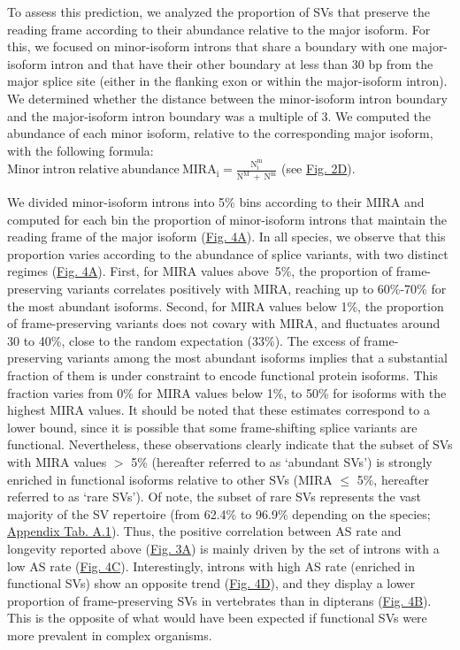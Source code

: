 To assess this prediction, we analyzed the proportion of \acrshort{SV}s that preserve the reading frame according to their abundance relative to the major isoform. For this, we focused on minor-isoform introns that share a boundary with one major-isoform intron and that have their other boundary at less than 30 bp from the major splice site (either in the flanking exon or within the major-isoform intron). We determined whether the distance between the minor-isoform intron boundary and the major-isoform intron boundary was a multiple of 3. We computed the abundance of each minor isoform, relative to the corresponding major isoform, with the following formula:\\
$\mathrm{Minor~intron~relative~abundance~MIRA_i=\frac{N_i^m}{N^M~+~N^m}}$ (see \hyperref[fig:AS2]{Fig. 2D}).


We divided minor-isoform introns into 5\% bins according to their MIRA and computed for each bin the proportion of minor-isoform introns that maintain the reading frame of the major isoform (\hyperref[fig:AS4]{Fig. 4A}). In all species, we observe that this proportion varies according to the abundance of splice variants, with two distinct regimes (\hyperref[fig:AS4]{Fig. 4A}). First, for MIRA values above~5\%, the proportion of frame-preserving variants correlates positively with MIRA, reaching up to 60\%-70\% for the most abundant isoforms. Second, for MIRA values below 1\%, the proportion of frame-preserving variants does not covary with MIRA, and fluctuates around 30 to 40\%, close to the random expectation (33\%). The excess of frame-preserving variants among the most abundant isoforms implies that a substantial fraction of them is under constraint to encode functional protein isoforms. This fraction varies from 0\% for MIRA values below 1\%, to 50\% for isoforms with the highest MIRA values. It should be noted that these estimates correspond to a lower bound, since it is possible that some frame-shifting splice variants are functional. Nevertheless, these observations clearly indicate that the subset of \acrshort{SV}s with MIRA values $>$ 5\% (hereafter referred to as ‘abundant \acrshort{SV}s’) is strongly enriched in functional isoforms relative to other \acrshort{SV}s (MIRA $\leq$ 5\%, hereafter referred to as ‘rare \acrshort{SV}s’). Of note, the subset of rare \acrshort{SV}s represents the vast majority of the \acrshort{SV} repertoire (from 62.4\% to 96.9\% depending on the species; \hyperref[table:1]{Appendix Tab. A.1}). Thus, the positive correlation between AS rate and longevity reported above (\hyperref[fig:AS3]{Fig. 3A}) is mainly driven by the set of introns with a low AS rate (\hyperref[fig:AS4]{Fig. 4C}). Interestingly, introns with high AS rate (enriched in functional \acrshort{SV}s) show an opposite trend (\hyperref[fig:AS4]{Fig. 4D}), and they display a lower proportion of frame-preserving \acrshort{SV}s in vertebrates than in dipterans (\hyperref[fig:AS4]{Fig. 4B}). This is the opposite of what would have been expected if functional \acrshort{SV}s were more prevalent in complex organisms.

